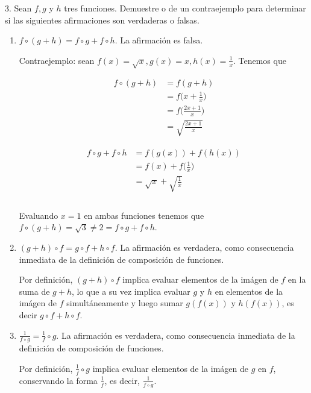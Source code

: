 \documentclass[11pt]{article}
\begin{document}
3. Sean $f,g$ y $h$ tres funciones. Demuestre o de un contraejemplo para determinar si las siguientes afirmaciones son verdaderas o falsas.
\begin{enumerate}[label=\roman*)]
  \item $f\circ (g+h)=f\circ g+ f\circ h$. La afirmación es falsa.
  
  Contraejemplo: sean $f(x)=\sqrt{x}, g(x)=x, h(x)=\frac{1}{x}$. Tenemos que 
  \begin{center}
  \noindent\begin{minipage}[r]{.5\linewidth}
  \begin{align*}
  f\circ (g+h) &= f(g+h)\\
  &=f\biggl(x+\frac{1}{x}\biggr)\\
  &=f\biggl(\frac{2x+1}{x}\biggr)\\
  &=\sqrt{\frac{2x+1}{x}}
  \end{align*}
  \end{minipage}%
  \begin{minipage}[l]{.5\linewidth}
  \begin{align*}
  f\circ g + f\circ h &= f(g(x)) + f(h(x)) \\
  &= f(x) + f\biggl(\frac{1}{x}\biggr)\\
  &= \sqrt{x}+\sqrt{\frac{1}{x}}\\
  \\
  \end{align*}
  \end{minipage}
  \end{center}

  Evaluando $x=1$ en ambas funciones tenemos que $f\circ (g+h) = \sqrt{3} \neq 2 = f\circ g + f\circ h$.

  \item $(g+h)\circ f = g \circ f + h \circ f$. La afirmación es verdadera, como consecuencia inmediata de la definición de composición de funciones.
  
  Por definición, $(g+h)\circ f$ implica evaluar elementos de la imágen de $f$ en la suma de $g+h$, lo que a su vez implica evaluar $g$ y $h$ en elementos de la imágen de $f$ simultáneamente y luego sumar $g(f(x))$ y $h(f(x))$, es decir $g\circ f + h\circ f$.
  
  \item $\frac{1}{f\circ g}=\frac{1}{f} \circ g$. La afirmación es verdadera, como consecuencia inmediata de la definición de composición de funciones.
  
  Por definición, $\frac{1}{f} \circ g$ implica evaluar elementos de la imágen de $g$ en $f$, conservando la forma $\frac{1}{f}$, es decir, $\frac{1}{f\circ g}$.


\end{enumerate}
\end{document}
